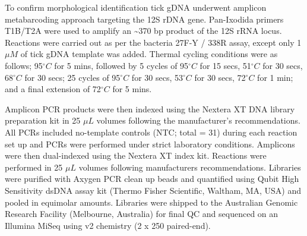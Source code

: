 \documentclass[a4paper, nobind]{templates/ociamthesis}
\begin{document}
To confirm morphological identification tick gDNA underwent amplicon metabarcoding approach targeting the 12S rDNA gene.
Pan-Ixodida primers T1B/T2A \autocite{beatiAnalysisSystematicRelationships2001} were used to amplify an \textasciitilde370 bp product of the 12S rRNA locus.
Reactions were carried out as per the bacteria 27F-Y / 338R assay, except only 1 \(\mu M\) of tick gDNA template was added.
Thermal cycling conditions were as follows; 95\(^\circ C\) for 5 mins, followed by 5 cycles of 95\(^\circ C\) for 15 secs, 51\(^\circ C\) for 30 secs, 68\(^\circ C\) for 30 secs; 25 cycles of 95\(^\circ C\) for 30 secs, 53\(^\circ C\) for 30 secs, 72\(^\circ C\) for 1 min; and a final extension of 72\(^\circ C\) for 5 mins.

Amplicon PCR products were then indexed using the Nextera XT DNA library preparation kit in 25 \(\mu L\) volumes following the manufacturer's recommendations.
All PCRs included no-template controls (NTC; total = 31) during each reaction set up and PCRs were performed under strict laboratory conditions.
Amplicons were then dual-indexed using the Nextera XT index kit.
Reactions were performed in 25 \(\mu L\) volumes following manufacturers recommendations.
Libraries were purified with Axygen PCR clean up beads and quantified using Qubit High Sensitivity dsDNA assay kit (Thermo Fisher Scientific, Waltham, MA, USA) and pooled in equimolar amounts.
Libraries were shipped to the Australian Genomic Research Facility (Melbourne, Australia) for final QC and sequenced on an Illumina MiSeq using v2 chemistry (2 x 250 paired-end).
\end{document}
